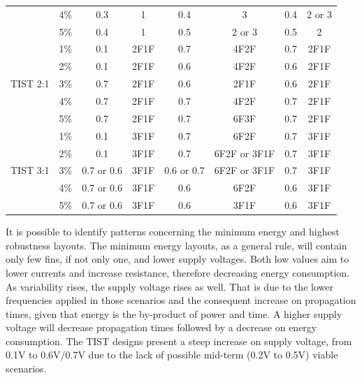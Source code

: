 \documentclass[diss,pgmicro,english]{iiufrgs}
\begin{document}
\begin{table}[t]
{\begin{tabular}{|c|c|c|c|c|c|c|c|}
                          & 4\% & 0.3        & 1      & 0.4        & 3            & 0.4        & 2 or 3 \\ \cline{2-8}
                          & 5\% & 0.4        & 1      & 0.5        & 2 or 3       & 0.5        & 2      \\ \hline
\multirow{5}{*}{TIST 2:1} & 1\% & 0.1        & 2F1F   & 0.7        & 4F2F         & 0.7        & 2F1F   \\ \cline{2-8}
                          & 2\% & 0.1        & 2F1F   & 0.6        & 4F2F         & 0.6        & 2F1F   \\ \cline{2-8}
                          & 3\% & 0.7        & 2F1F   & 0.6        & 2F1F         & 0.6        & 2F1F   \\ \cline{2-8}
                          & 4\% & 0.7        & 2F1F   & 0.7        & 4F2F         & 0.7        & 2F1F   \\ \cline{2-8}
                          & 5\% & 0.7        & 2F1F   & 0.7        & 6F3F         & 0.7        & 2F1F   \\ \hline
\multirow{5}{*}{TIST 3:1} & 1\% & 0.1        & 3F1F   & 0.7        & 6F2F         & 0.7        & 3F1F   \\ \cline{2-8}
                          & 2\% & 0.1        & 3F1F   & 0.7        & 6F2F or 3F1F & 0.7        & 3F1F   \\ \cline{2-8}
                          & 3\% & 0.7 or 0.6 & 3F1F   & 0.6 or 0.7 & 6F2F or 3F1F & 0.7        & 3F1F   \\ \cline{2-8}
                          & 4\% & 0.7 or 0.6 & 3F1F   & 0.6        & 6F2F         & 0.6        & 3F1F   \\ \cline{2-8}
                          & 5\% & 0.7 or 0.6 & 3F1F   & 0.6        & 3F1F         & 0.6        & 3F1F   \\ \hline
\end{tabular}
}
\end{table}

	It is possible to identify patterns concerning the minimum energy and highest robustness layouts. The minimum energy layouts, as a general rule, will contain only few fins, if not only one, and lower supply voltages. Both low values aim to lower currents and increase resistance, therefore decreasing energy consumption. As variability rises, the supply voltage rises as well. That is due to the lower frequencies applied in those scenarios and the consequent increase on propagation times, given that energy is the by-product of power and time. A higher supply voltage will decrease propagation times followed by a decrease on energy consumption. The TIST designs present a steep increase on supply voltage, from 0.1V to 0.6V/0.7V due to the lack of possible mid-term (0.2V to 0.5V) viable scenarios.
\end{document}
